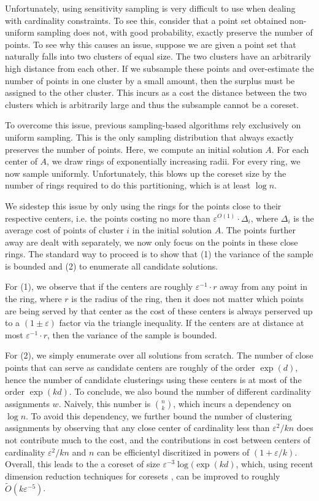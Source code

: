 Unfortunately, using sensitivity sampling is very difficult to use when dealing with cardinality constraints. To see this, consider that a point set obtained non-uniform sampling does not, with good probability, exactly preserve the number of points. To see why this causes an issue, suppose we are given a point set that naturally falls into two clusters of equal size. The two clusters have an arbitrarily high distance from each other. If we subsample these points and over-estimate the number of points in one cluster by a small amount, then the surplus must be assigned to the other cluster. This incurs as a cost the distance between the two clusters which is arbitrarily large and thus the subsample cannot be a coreset.

To overcome this issue, previous sampling-based algorithms \cite{BandyapadhyayFS21,Cohen-AddadL19} rely exclusively on uniform sampling. This is the only sampling distribution that always exactly preserves the number of points. 
Here, we compute an initial solution $A$. For each center of $A$, we draw rings of exponentially increasing radii. For every ring, we now sample uniformly. 
Unfortunately, this blows up the coreset size by the number of rings required to do this partitioning, which is at least $\log n$.

We sidestep this issue by only using the rings for the points close to their respective centers, i.e. the points costing no more than $\varepsilon^{O(1)} \cdot \Delta_i$, where $\Delta_i$ is the average cost of points of cluster $i$ in the initial solution $A$.
The points further away are dealt with separately, we now only focus on the points in these close rings.
The standard way to proceed is to show that (1) the variance of the sample is bounded and (2) to enumerate all candidate solutions. 

For (1), we observe that if the centers are roughly $\varepsilon^{-1}\cdot r$ away from any point in the ring, where $r$ is the radius of the ring, then it does not matter which points are being served by that center as the cost of these centers is always perserved up to a $(1\pm \varepsilon)$ factor via the triangle inequality. If the centers are at distance at most $\varepsilon^{-1}\cdot r$, then the variance of the sample is bounded.

For (2), we simply enumerate over all solutions from scratch. The number of close points that can serve as candidate centers are roughly of the order $\exp(d)$, hence the number of candidate clusterings using these centers is at most of the order $\exp(kd)$. To conclude, we also bound the number of different cardinality assignments $w$. Naively, this number is ${n\choose k}$, which incurs a dependency on $\log n$. To avoid this dependency, we further bound the number of clustering assignments by observing that any close center of cardinality less than $\varepsilon^2/k n$ does not contribute much to the cost, and the contributions in cost between centers of cardinality $\varepsilon^2/k n$  and $n$ can be efficientyl discritized in powers of $(1+\varepsilon/k)$. Overall, this leads to the a coreset of size $\varepsilon^{-3} \log(\exp(kd)$, which, using recent dimension reduction techniques for coresets \cite{stoc,huang2020coresets}, can be improved to roughly $\tilde{O}(k\varepsilon^{-5})$.

